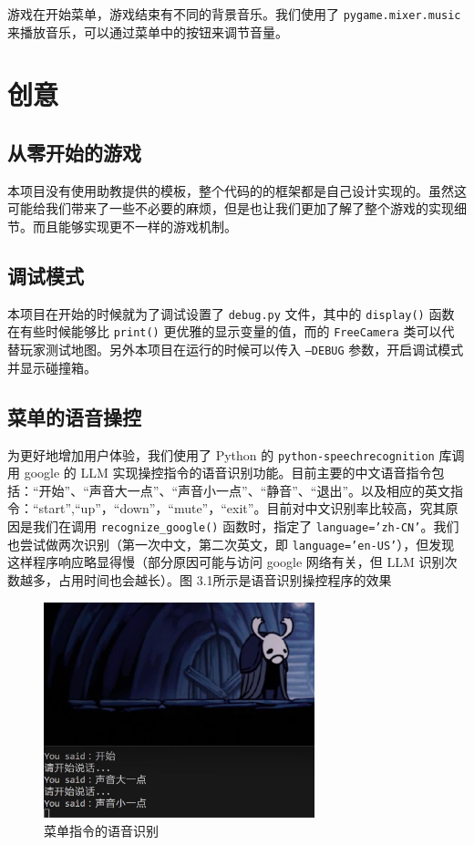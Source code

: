 \documentclass[12pt, twoside, a4paper]{article}
\newcommand{\inlinecode}[1]{\setlength{\fboxsep}{0.8mm} \colorbox{lightgray!40}{\texttt{#1}}}
\begin{document}
游戏在开始菜单，游戏结束有不同的背景音乐。我们使用了 \inlinecode{pygame.mixer.music} 来播放音乐，可以通过菜单中的按钮来调节音量。

\section{创意}

\subsection{从零开始的游戏}

本项目没有使用助教提供的模板，整个代码的的框架都是自己设计实现的。虽然这可能给我们带来了一些不必要的麻烦，但是也让我们更加了解了整个游戏的实现细节。而且能够实现更不一样的游戏机制。

\subsection{调试模式}

本项目在开始的时候就为了调试设置了 \inlinecode{debug.py} 文件，其中的 \inlinecode{display()} 函数在有些时候能够比 \inlinecode{print()} 更优雅的显示变量的值，而的 \inlinecode{FreeCamera} 类可以代替玩家测试地图。另外本项目在运行的时候可以传入 \inlinecode{--DEBUG} 参数，开启调试模式并显示碰撞箱。

\subsection{菜单的语音操控}

为更好地增加用户体验，我们使用了 Python 的 \inlinecode{python-speechrecognition} 库调用 google 的 LLM 实现操控指令的语音识别功能。目前主要的中文语音指令包括：“开始”、“声音大一点”、“声音小一点”、“静音”、“退出”。以及相应的英文指令：“start”,“up”，“down”，“mute”，“exit”。目前对中文识别率比较高，究其原因是我们在调用 \inlinecode{recognize\_google()} 函数时，指定了 \inlinecode{language='zh-CN'}。我们也尝试做两次识别（第一次中文，第二次英文，即 \inlinecode{language='en-US'}），但发现这样程序响应略显得慢（部分原因可能与访问 google 网络有关，但 LLM 识别次数越多，占用时间也会越长）。图 3.1所示是语音识别操控程序的效果

\begin{figure}[h!]
    \centering
    \includegraphics[width=0.7\textwidth]{assets/report/speak.png}
    \caption{菜单指令的语音识别}
\end{figure}
\end{document}

